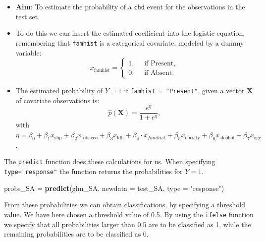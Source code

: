 \documentclass[10pt,ignorenonframetext,]{beamer}
\newenvironment{Shaded}{\begin{snugshade}}{\end{snugshade}}
\newcommand{\KeywordTok}[1]{\textcolor[rgb]{0.13,0.29,0.53}{\textbf{#1}}}
\newcommand{\DataTypeTok}[1]{\textcolor[rgb]{0.13,0.29,0.53}{#1}}
\newcommand{\StringTok}[1]{\textcolor[rgb]{0.31,0.60,0.02}{#1}}
\newcommand{\NormalTok}[1]{#1}
\begin{document}
\begin{frame}[fragile]

\begin{itemize}
\item
  \textbf{Aim}: To estimate the probability of a \texttt{chd} event for
  the observations in the test set.
\item
  To do this we can insert the estimated coefficient into the logistic
  equation, remembering that \texttt{famhist} is a categorical
  covariate, modeled by a dummy variable:
  \[x_\text{famhist} = \begin{cases} 1, \quad \text{ if Present}, \\ 0, \quad \text{ if Absent}.\end{cases}\]
\item
  The estimated probability of \(Y=1\) if
  \texttt{famhist\ =\ "Present"}, given a vector \(\mathbf{X}\) of
  covariate observations is:
  \[\hat{p}(\mathbf{X}) =\frac{e^\eta}{1+e^\eta} ,\] with
  \(\eta=\beta_0 + \beta_1 x_{\text{sbp}} + \beta_2 x_{\text{tobacco}} + \beta_3 x_\text{ldh} + \beta_4 \cdot x_{famhist} + \beta_5 x_\text{obesity} + \beta_6 x_\text{alcohol} + \beta_7 x_{\text{age}}\).
\end{itemize}

\end{frame}

\begin{frame}[fragile]

The \texttt{predict} function does these calculations for us. When
specifying \texttt{type="response"} the function returns the
probabilities for \(Y=1\).

\scriptsize

\begin{Shaded}
\begin{Highlighting}[]
\NormalTok{probs_SA =}\StringTok{ }\KeywordTok{predict}\NormalTok{(glm_SA, }\DataTypeTok{newdata =}\NormalTok{ test_SA, }\DataTypeTok{type =} \StringTok{"response"}\NormalTok{)}
\end{Highlighting}
\end{Shaded}

\normalsize

From these probabilities we can obtain classifications, by specifying a
threshold value. We have here chosen a threshold value of 0.5. By using
the \texttt{ifelse} function we specify that all probabilities larger
than 0.5 are to be classified as 1, while the remaining probabilities
are to be classified as 0.

\end{frame}
\end{document}
